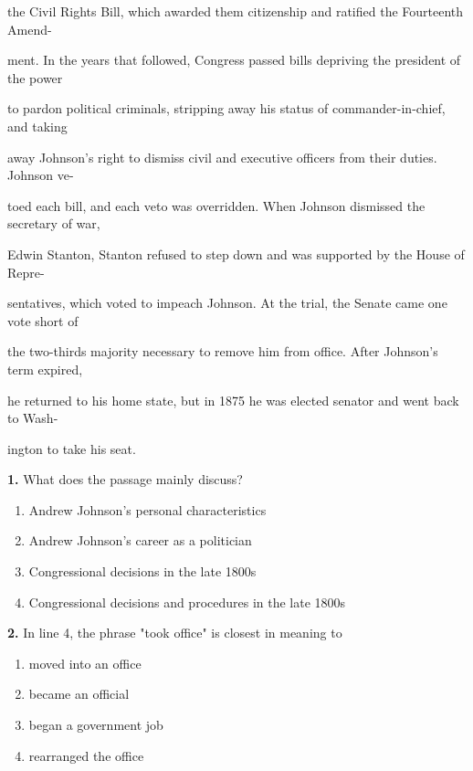 \documentclass[12pt]{article}
\begin{document}
the Civil Rights Bill, which awarded them citizenship and ratified the Fourteenth Amend-\par
ment. In the years that followed, Congress passed bills depriving the president of the power\par
to pardon political criminals, stripping away his status of commander-in-chief, and taking\par
away Johnson's right to dismiss civil and executive officers from their duties. Johnson ve-\par
toed each bill, and each veto was overridden. When Johnson dismissed the secretary of war,\par
Edwin Stanton, Stanton refused to step down and was supported by the House of Repre-\par
sentatives, which voted to impeach Johnson. At the trial, the Senate came one vote short of\par
the two-thirds majority necessary to remove him from office. After Johnson's term expired,\par
he returned to his home state, but in 1875 he was elected senator and went back to Wash-\par
ington to take his seat.\par
\endgroup
\medskip
\noindent\textbf{1.} What does the passage mainly discuss?
\begin{enumerate}[label=(\Alph*),leftmargin=*,itemsep=0.2em]
\item Andrew Johnson's personal characteristics
\item Andrew Johnson's career as a politician
\item Congressional decisions in the late 1800s
\item Congressional decisions and procedures in the late 1800s
\end{enumerate}
\par
\vspace{0.25\baselineskip}
\noindent\textbf{2.} In line 4, the phrase "took office" is closest in meaning to
\begin{enumerate}[label=(\Alph*),leftmargin=*,itemsep=0.2em]
\item moved into an office
\item became an official
\item began a government job
\item rearranged the office
\end{enumerate}
\par
\vspace{0.25\baselineskip}
\end{document}
